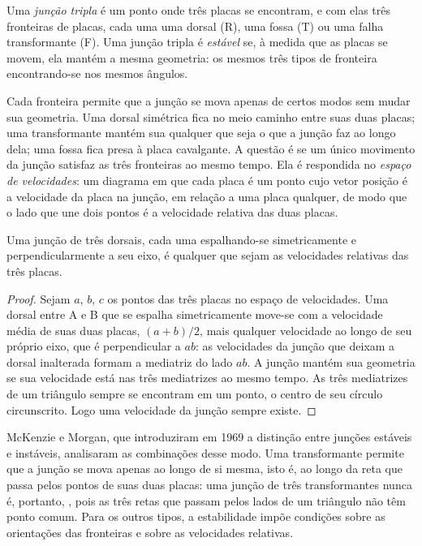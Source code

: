 \begin{definition}\label{def:b1:plate-kinematics:triple-junction}
Uma \emph{junção tripla} é um ponto onde três placas se encontram, e com elas três fronteiras de placas, cada uma uma dorsal (R), uma fossa (T) ou uma
falha transformante (F). Uma junção tripla é \emph{estável} se, à medida que as placas se movem, ela mantém a mesma geometria: os mesmos três
tipos de fronteira encontrando-se nos mesmos ângulos.
\end{definition}

Cada fronteira permite que a junção se mova apenas de certos modos sem mudar
sua geometria. Uma dorsal simétrica fica no meio caminho entre suas duas placas; uma
transformante mantém sua  qualquer que seja o que a junção faz ao longo dela; uma fossa fica
presa à placa cavalgante. A questão é se um único movimento da
junção satisfaz as três fronteiras ao mesmo tempo. Ela é respondida no
\emph{espaço de velocidades}: um diagrama em que cada placa é um ponto cujo vetor posição
é a velocidade da placa na junção, em relação a uma placa qualquer, de modo que
o lado que une dois pontos é a velocidade relativa das duas placas.

\begin{proposition}\label{prop:b1:plate-kinematics:rrr}
Uma junção de três dorsais, cada uma espalhando-se simetricamente e perpendicularmente
a seu eixo, é  qualquer que sejam as velocidades relativas das três placas.
\end{proposition}

\begin{proof}
Sejam $a$, $b$, $c$ os pontos das três placas no espaço de velocidades. Uma dorsal
entre A e B que se espalha simetricamente move-se com a velocidade média de suas
duas placas, $(a + b)/2$, mais qualquer velocidade ao longo de seu próprio eixo, que é
perpendicular a $ab$: as velocidades da junção que deixam a dorsal
inalterada formam a mediatriz do lado $ab$. A junção mantém
sua geometria se sua velocidade está nas três mediatrizes ao mesmo tempo.
As três mediatrizes de um triângulo sempre se encontram em um ponto, o
centro de seu círculo circunscrito. Logo uma velocidade da junção sempre
existe.
\end{proof}

McKenzie e Morgan, que introduziram em 1969 a distinção entre junções estáveis e instáveis,
analisaram as combinações desse modo. Uma transformante permite que a
junção se mova apenas ao longo de si mesma, isto é, ao longo da reta que passa pelos pontos
de suas duas placas: uma junção de três transformantes nunca é, portanto, ,
pois as três retas que passam pelos lados de um triângulo não têm ponto comum. Para
os outros tipos, a estabilidade impõe condições sobre as orientações das
fronteiras e sobre as velocidades relativas.

